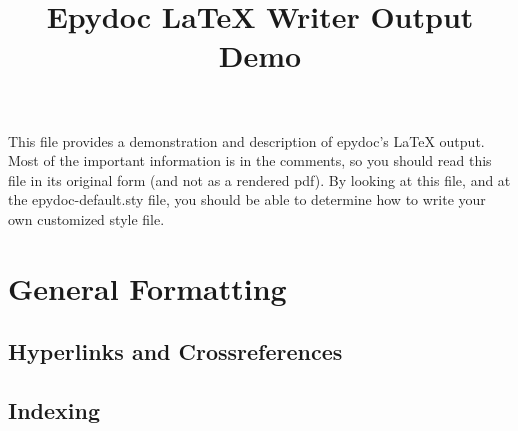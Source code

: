 \documentclass{article}
\begin{document}
\title{Epydoc LaTeX Writer Output Demo}
\author{}
\date{}
\maketitle

This file provides a demonstration and description of epydoc's LaTeX
output.  Most of the important information is in the comments, so you
should read this file in its original form (and not as a rendered pdf).
By looking at this file, and at the epydoc-default.sty file, you should
be able to determine how to write your own customized style file.


\section{General Formatting}

\subsection{Hyperlinks and Crossreferences}





\subsection{Indexing}
\end{document}
